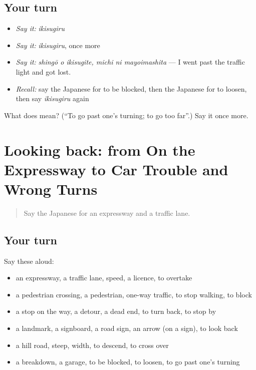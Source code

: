 \subsection*{Your turn}
\begin{itemize}
\raggedright
  \item \emph{Say it:} \emph{ikisugiru}
  \item \emph{Say it:} \emph{ikisugiru}, once more
  \item \emph{Say it:} \emph{shingō o ikisugite, michi ni mayoimashita} — I went past the traffic light and got lost.
  \item \emph{Recall:} say the Japanese for to be blocked, then the Japanese for to loosen, then say \emph{ikisugiru} again
\end{itemize}

\begin{tcolorbox}[breakable,colback=teal!4,colframe=teal!35!black,title={Before you move on}]
What does  mean? (\textquotedblleft{}To go past one's turning; to go too far\textquotedblright{}.) Say it once more.
\end{tcolorbox}
\section[(dialogue)]{Looking back: from On the Expressway to Car Trouble and Wrong Turns}

\label{lesson:JA-R395-review-390-395}



\begin{quote}
Say the Japanese for an expressway and a traffic lane.
\end{quote}

\subsection*{Your turn}
Say these aloud:

\begin{itemize}
\raggedright
  \item an expressway, a traffic lane, speed, a licence, to overtake
  \item a pedestrian crossing, a pedestrian, one-way traffic, to stop walking, to block
  \item a stop on the way, a detour, a dead end, to turn back, to stop by
  \item a landmark, a signboard, a road sign, an arrow (on a sign), to look back
  \item a hill road, steep, width, to descend, to cross over
  \item a breakdown, a garage, to be blocked, to loosen, to go past one's turning
\end{itemize}

